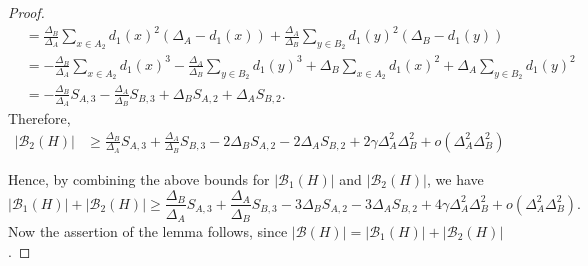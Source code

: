 \documentclass[10pt,a4paper]{amsart}
\newcommand{\bb}{\mathcal{B}}
\begin{document}
\begin{proof}
\begin{align*}
    &=\frac{\Delta_B}{\Delta_A}\sum_{x\in A_2} d_1(x)^2(\Delta_A-d_1(x))+\frac{\Delta_A}{\Delta_B}\sum_{y\in B_2} d_1(y)^2(\Delta_B-d_1(y))\\
    &=-\frac{\Delta_B}{\Delta_A}\sum_{x\in A_2} d_1(x)^3 -\frac{\Delta_A}{\Delta_B} \sum_{y\in B_2} d_1(y)^3 + \Delta_B \sum_{x\in A_2} d_1(x)^2 + \Delta_A \sum_{y\in B_2} d_1(y)^2\\
     &=-\frac{\Delta_B}{\Delta_A}S_{A,3} -\frac{\Delta_A}{\Delta_B} S_{B,3} + \Delta_B S_{A,2} + \Delta_A S_{B,2} .
\end{align*}
Therefore,
    \begin{align*}
        |\bb_2(H)|&\ge    \frac{\Delta_B}{\Delta_A}S_{A,3}+\frac{\Delta_A}{\Delta_B} S_{B,3}- 2\Delta_B S_{A,2} -2\Delta_A S_{B,2} + 2\gamma \Delta_A^2\Delta_B^2
        +o(\Delta_A^2\Delta_B^2)
    \end{align*}
 
Hence, by combining the above bounds for $|\bb_1(H)|$ and $|\bb_2(H)|$, we have 
 \[
  |\bb_1(H)|+|\bb_2(H)|\ge  \frac{\Delta_B}{\Delta_A}S_{A,3}+\frac{\Delta_A}{\Delta_B} S_{B,3}- 3\Delta_B S_{A,2} -3\Delta_A S_{B,2} + 4\gamma \Delta_A^2\Delta_B^2
       +o(\Delta_A^2 \Delta_B^2). \]
Now the assertion of the lemma follows, since $|\bb(H)|=|\bb_1(H)|+|\bb_2(H)|$. 
\end{proof}
\end{document}
